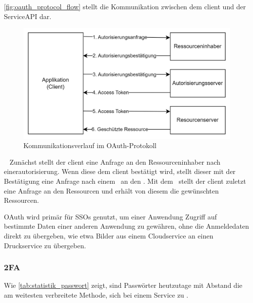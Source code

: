 \autoref{fig:oauth_protocol_flow}\autocite[\vglf][, Abbildung 1]{rfc6749} stellt die Kommunikation zwischen dem \gls{client} und der Service\nonbreakdash\ac{API} dar.
\begin{figure}[htbp]
    \centering
    \includegraphics[width=1\linewidth]{abbildungen/OAuth_abstract_flow}
    \caption[Kommunikationsverlauf im OAuth-Protokoll]{Kommunikationsverlauf im OAuth-Protokoll\footnotemark}
    \label{fig:oauth_protocol_flow}
\end{figure}\ 
Zunächst stellt der \gls{client} eine Anfrage an den Ressourceninhaber nach einer\gls{autorisierung}.
Wenn diese dem \gls{client} bestätigt wird, stellt dieser mit der Bestätigung eine Anfrage nach einem\  an den .
Mit dem\  stellt der \gls{client} zuletzt eine Anfrage an den Ressourcen und erhält von diesem die gewünschten Ressourcen.

OAuth wird primär für \acp{SSO} genutzt, um \zb einer Anwendung Zugriff auf bestimmte Daten einer anderen Anwendung zu gewähren, ohne die Anmeldedaten direkt zu übergeben, wie etwa Bilder aus einem Cloudservice an einen Druckservice zu übergeben.\autocite[\vglf][]{OAuthWebProtocol:2012}

\subsubsection[2-Faktor-Authentifizierung]{\acf{2FA}}\label{subsubsec:2fa}
Wie \autoref{tab:statistik_passwort}\autocite{statista-authentifizierung} zeigt, sind Passwörter heutzutage mit Abstand die am weitesten verbreitete Methode, sich bei einem Service zu .

